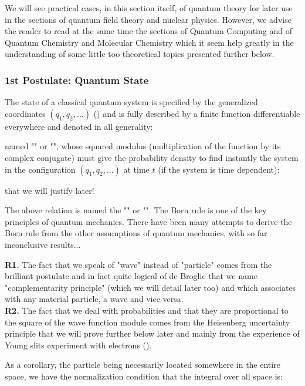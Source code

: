 	
	\begin{tcolorbox}[title=Remark,colframe=black,arc=10pt]
	We will see practical cases, in this section itself, of quantum theory for later use in the sections of quantum field theory and nuclear physics. However, we advise the reader to read at the same time the sections of Quantum Computing and of Quantum Chemistry and Molecular Chemistry which it seem help greatly in the understanding of some little too theoretical topics presented further below.
	\end{tcolorbox}
	
	\subsubsection{1st Postulate: Quantum State}\label{first postulate wave quantum physics}
	The state of a classical quantum system is specified by the generalized coordinates $(q_1,q_2,...)$ () and is fully described by a finite function differentiable everywhere and denoted in all generality:
	
	named "" or "", whose squared modulus (multiplication of the function by its complex conjugate) must give the probability density to find instantly the system in the configuration $(q_1,q_2,...)$ at time $t$ (if the system is time dependent):
	
	that we will justify later!
	
	The above relation is named the "" or "". The Born rule is one of the key principles of quantum mechanics. There have been many attempts to derive the Born rule from the other assumptions of quantum mechanics, with so far inconclusive results...
	
	\begin{tcolorbox}[title=Remarks,colframe=black,arc=10pt]
	\textbf{R1.} The fact that we speak of "wave" instead of "particle" comes from the brilliant postulate and in fact quite logical of de Broglie that we name "complementarity principle" (which we will detail later too) and which associates with any material particle, a wave and vice versa.\\
	
	\textbf{R2.} The fact that we deal with probabilities and that they are proportional to the square of the wave function module comes from the Heisenberg uncertainty principle that we will prove further below later and mainly from the experience of Young slits experiment with electrons ().
	\end{tcolorbox}
	As a corollary, the particle being necessarily located somewhere in the entire space, we have the normalization condition that the integral over all space is:
	

